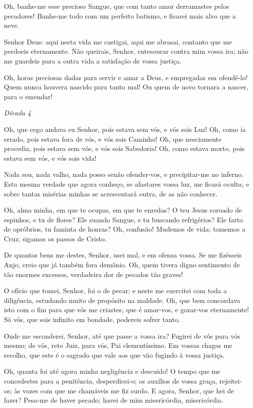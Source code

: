 Oh, banhe-me esse precioso Sangue, que com tanto amor derramastes pelos pecadores! Banhe-me todo com um perfeito batismo, e ficarei mais alvo que a neve.

Senhor Deus: aqui nesta vida me castigai, aqui me abrasai, contanto que me perdoeis eternamente. Não queirais, Senhor, entesourar contra mim vossa ira; não me guardeis para a outra vida a satisfação de vossa justiça.

Oh, horas preciosas dadas para servir e amar a Deus, e empregadas em ofendê-lo! Quem nunca houvera nascido para tanto mal! Ou quem de novo tornara a nascer, para o emendar!

\begin{nscenter} \emph{Década 4} \end{nscenter}

Oh, que cego andava eu Senhor, pois estava sem vós, e vós sois Luz! Oh, como ia errado, pois estava fora de vós, e vós sois Caminho! Oh, que nesciamente procedia, pois estava sem vós, e vós sois Sabedoria! Oh, como estava morto, pois estava sem vós, e vós sois vida!

Nada sou, nada valho, nada posso senão ofender-vos, e precipitar-me no inferno. Esta mesma verdade que agora conheço, se afastares vossa luz, me ficará oculta; e sobre tantas misérias minhas se acrescentará outra, de as não conhecer.

Oh, alma minha, em que te ocupas, em que te enredas? O teu Jesus coroado de espinhos, e tu de flores? Ele suando Sangue, e tu buscando refrigérios? Ele farto de opróbrios, tu faminta de honras? Oh, confusão! Mudemos de vida; tomemos a Cruz; sigamos os passos de Cristo.

De quantos bens me destes, Senhor, usei mal, e em ofensa vossa. Se me fizésseis Anjo, creio que já também fora demônio. Oh, quem tivera digno sentimento de tão enormes excessos, verdadeira dor de pecados tão graves!

O ofício que tomei, Senhor, foi o de pecar; e neste me exercitei com toda a diligência, estudando muito de propósito na maldade. Oh, que bem concordava isto com o fim para que vós me criastes, que é amar-vos, e gozar-vos eternamente! Só vós, que sois infinito em bondade, podereis sofrer tanto.

Onde me esconderei, Senhor, até que passe a vossa ira? Fugirei de vós para vós mesmo; de vós, reto Juiz, para vós, Pai clementíssimo. Em vossas chagas me recolho, que este é o sagrado que vale aos que vão fugindo à vossa justiça.

Oh, quanta foi até agora minha negligência e descuido! O tempo que me concedestes para a penitência, desperdicei-o; os auxílios de vossa graça, rejeitei-os; às vozes com que me chamáveis me fiz surdo. E agora, Senhor, que hei de fazer? Pesa-me de haver pecado; havei de mim misericórdia, misericórdia.

